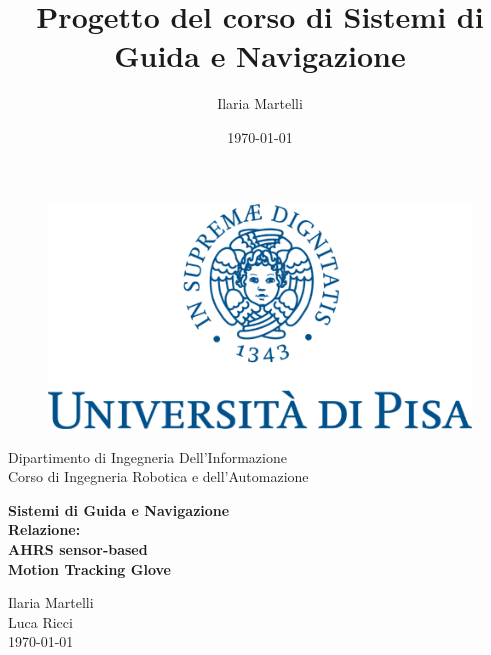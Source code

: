 
\title{Progetto del corso di Sistemi di Guida e Navigazione}
\author{
  Ilaria Martelli\\
}
\date{\today}

\begin{figure}[htp]
\includegraphics[scale=0.8]{immagini/unipi.png}
\centering
\end{figure}

\begin{center}
\sc\centering\onehalfspacing\fontsize{4mm}{6mm}\selectfont Dipartimento di Ingegneria Dell'Informazione\\Corso di Ingegneria Robotica e dell'Automazione\\
\end{center}
\begin{center}
\vspace{2cm}

\Huge\bfseries\sc Sistemi di Guida e Navigazione\\[1cm] \bfseries\Large\sc Relazione:\\ AHRS sensor-based\\ Motion Tracking Glove %
\end{center}
\vspace{2cm}


\begin{center}
Ilaria Martelli\\
Luca Ricci\\
\vspace{0.5cm}
\today
\end{center}
\clearpage